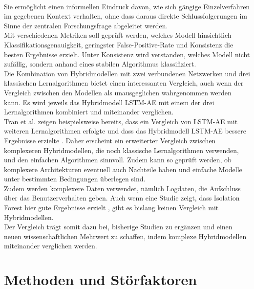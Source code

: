 \documentclass[a4paper,12pt]{article}
\begin{document}
	\\[0.5em]
	Sie ermöglicht einen informellen Eindruck davon, wie sich gängige Einzelverfahren im gegebenen Kontext verhalten, ohne dass daraus direkte Schlussfolgerungen im Sinne der zentralen Forschungsfrage abgeleitet werden.
	\\[0.5em]
	Mit verschiedenen Metriken soll geprüft werden, welches Modell hinsichtlich Klassifikationsgenauigkeit, geringster False-Positive-Rate und Konsistenz die besten Ergebnisse erzielt. Unter Konsistenz wird verstanden, welches Modell nicht zufällig, sondern anhand eines stabilen Algorithmus klassifiziert.
	\\[0.5em]
	Die Kombination von Hybridmodellen mit zwei verbundenen Netzwerken und drei klassischen Lernalgorithmen bietet einen interessanten Vergleich, auch wenn der Vergleich zwischen den Modellen als unausgeglichen wahrgenommen werden kann. Es wird jeweils das Hybridmodell LSTM-AE mit einem der drei Lernalgorithmen kombiniert und miteinander verglichen.
	\\[0.5em]
	Tran et al. zeigen beispielsweise bereits, dass ein Vergleich von LSTM-AE mit weiteren Lernalgorithmen erfolgte und dass das Hybridmodell LSTM-AE bessere Ergebnisse erzielte \cite{tran2021forecasting}. Daher erscheint ein erweiterter Vergleich zwischen komplexeren Hybridmodellen, die noch klassische Lernalgorithmen verwenden, und den einfachen Algorithmen sinnvoll. Zudem kann so geprüft werden, ob komplexere Architekturen eventuell auch Nachteile haben und einfache Modelle unter bestimmten Bedingungen überlegen sind.
	\\[0.5em]
	Zudem werden komplexere Daten verwendet, nämlich Logdaten, die Aufschluss über das Benutzerverhalten geben. Auch wenn eine Studie zeigt, dass Isolation Forest hier gute Ergebnisse erzielt \cite{yan2021extended}, gibt es bislang keinen Vergleich mit Hybridmodellen.
	\\[0.5em]
	Der Vergleich trägt somit dazu bei, bisherige Studien zu ergänzen und einen neuen wissenschaftlichen Mehrwert zu schaffen, indem komplexe Hybridmodellen miteinander verglichen werden.
	
	\section{Methoden und Störfaktoren}
\end{document}

